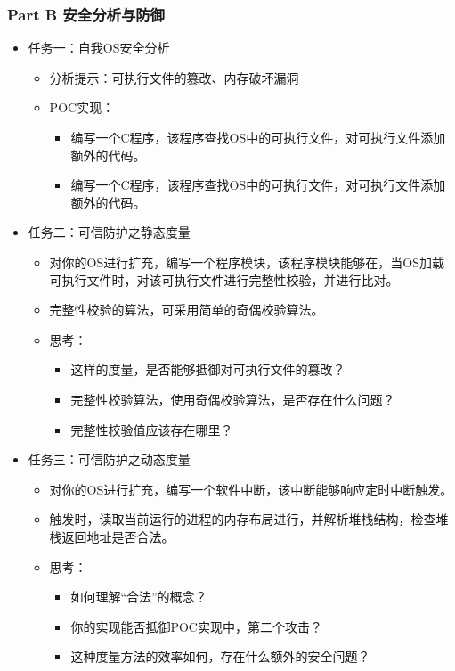 \documentclass{whureport}
\begin{document}
\subsubsection{Part B 安全分析与防御}
\begin{itemize}
  \item 任务一：自我OS安全分析
 \begin{itemize}
  \item 分析提示：可执行文件的篡改、内存破坏漏洞
  \item POC实现：
  \begin{itemize}
  \item 编写一个C程序，该程序查找OS中的可执行文件，对可执行文件添加额外的代码。
  \item 编写一个C程序，该程序查找OS中的可执行文件，对可执行文件添加额外的代码。
\end{itemize}

\end{itemize}
\item 任务二：可信防护之静态度量
\begin{itemize}
  \item 对你的OS进行扩充，编写一个程序模块，该程序模块能够在，当OS加载可执行文件时，对该可执行文件进行完整性校验，并进行比对。
  \item 完整性校验的算法，可采用简单的奇偶校验算法。
  \item 思考：
  \begin{itemize}
  \item 这样的度量，是否能够抵御对可执行文件的篡改？
  \item 完整性校验算法，使用奇偶校验算法，是否存在什么问题？
  \item 完整性校验值应该存在哪里？
\end{itemize}

\end{itemize}
\item 任务三：可信防护之动态度量
\begin{itemize}
  \item 对你的OS进行扩充，编写一个软件中断，该中断能够响应定时中断触发。
  \item 触发时，读取当前运行的进程的内存布局进行，并解析堆栈结构，检查堆栈返回地址是否合法。
  \item 思考：
  \begin{itemize}
  \item 如何理解“合法”的概念？
  \item 你的实现能否抵御POC实现中，第二个攻击？
  \item 这种度量方法的效率如何，存在什么额外的安全问题？
\end{itemize}


\end{itemize}


\end{itemize}
\end{document}
